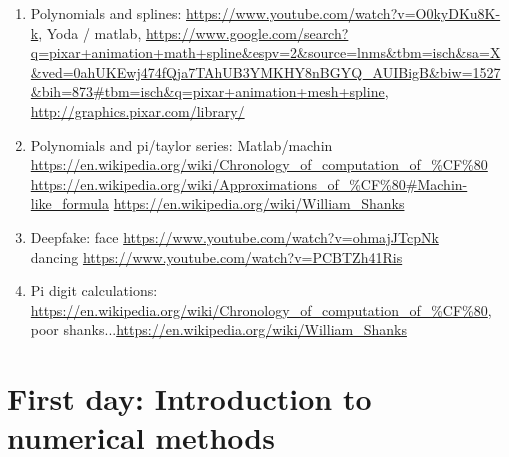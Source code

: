 \documentclass{article}
\theoremstyle{remark}
\begin{document}
\begin{enumerate}
\item Polynomials and splines: \url{https://www.youtube.com/watch?v=O0kyDKu8K-k}, Yoda / matlab, \url{https://www.google.com/search?q=pixar+animation+math+spline&espv=2&source=lnms&tbm=isch&sa=X&ved=0ahUKEwj474fQja7TAhUB3YMKHY8nBGYQ_AUIBigB&biw=1527&bih=873#tbm=isch&q=pixar+animation+mesh+spline}, \url{http://graphics.pixar.com/library/}
\item Polynomials and pi/taylor series: Matlab/machin \url{https://en.wikipedia.org/wiki/Chronology_of_computation_of_%CF%80} 
\url{https://en.wikipedia.org/wiki/Approximations_of_%CF%80#Machin-like_formula}
\url{https://en.wikipedia.org/wiki/William_Shanks}
\item Deepfake: face \url{https://www.youtube.com/watch?v=ohmajJTcpNk} \\
dancing \url{https://www.youtube.com/watch?v=PCBTZh41Ris}
\item Pi digit calculations: \url{https://en.wikipedia.org/wiki/Chronology_of_computation_of_%CF%80}, poor shanks...\url{https://en.wikipedia.org/wiki/William_Shanks}
\end{enumerate}


\section{First day: Introduction to numerical methods}
\end{document}
